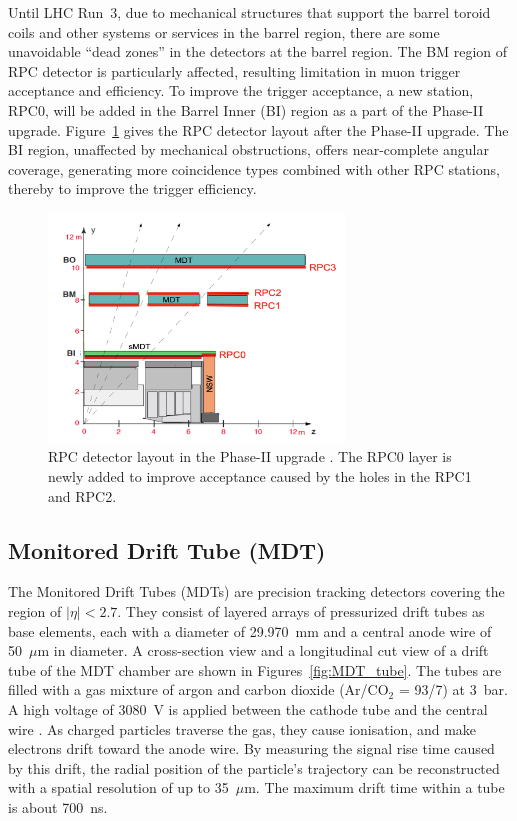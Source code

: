 Until LHC Run~3, due to mechanical structures that support the barrel toroid coils and other systems or services in the barrel region, there are some unavoidable ``dead zones'' in the detectors at the barrel region. The BM region of RPC detector is particularly affected, resulting limitation in muon trigger acceptance and efficiency. To improve the trigger acceptance, a new station, RPC0, will be added in the Barrel Inner (BI) region as a part of the Phase-II upgrade. Figure~\ref{fig:RPC_structure_upgrade} gives the RPC detector layout after the Phase-II upgrade. The BI region, unaffected by mechanical obstructions, offers near-complete angular coverage, generating more coincidence types combined with other RPC stations, thereby to improve the trigger efficiency.

\begin{figure}[htbp]
  \centering
  \includegraphics[width=0.7\textwidth]{figs/chapter2/RPC_detector_structure.png}
  \caption{RPC detector layout in the Phase-II upgrade \cite{TDAQ_TDR}. The RPC0 layer is newly added to improve acceptance caused by the holes in the RPC1 and RPC2.}
  \label{fig:RPC_structure_upgrade}
\end{figure}

\subsection{Monitored Drift Tube (MDT)}
The Monitored Drift Tubes (MDTs) are precision tracking detectors covering the region of $|\eta| < 2.7$. They consist of layered arrays of pressurized drift tubes as base elements, each with a diameter of 29.970~mm and a central anode wire of 50~$\mu$m in diameter. A cross-section view and a longitudinal cut view of a drift tube of the MDT chamber are shown in Figures~\ref{fig:MDT_tube}. The tubes are filled with a gas mixture of argon and carbon dioxide (Ar/CO$_2$ = 93/7) at 3~bar. A high voltage of 3080~V is applied between the cathode tube and the central wire \cite{ATLASDetector2008}. As charged particles traverse the gas, they cause ionisation, and make electrons drift toward the anode wire. By measuring the signal rise time caused by this drift, the radial position of the particle's trajectory can be reconstructed with a spatial resolution of up to 35~$\mu$m. The maximum drift time within a tube is about 700~ns.

